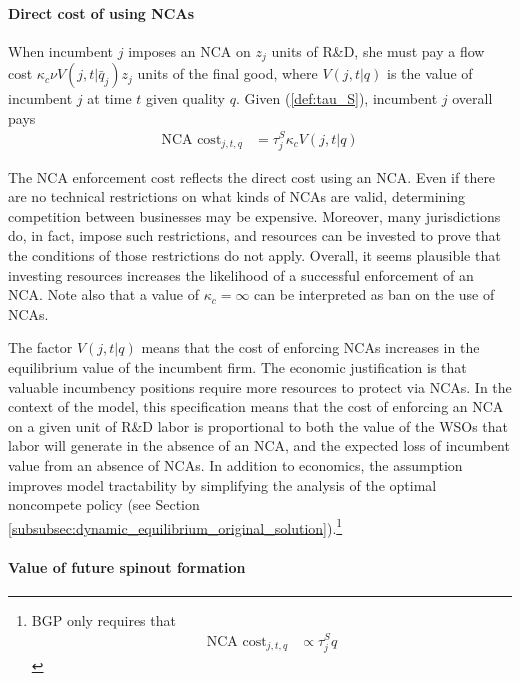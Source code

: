 \documentclass[11pt,english]{article}
\begin{document}
\paragraph{Direct cost of using NCAs}\label{paragraph:nca_cost}

When incumbent $j$ imposes an NCA on $z_j$ units of R\&D, she must pay a flow cost $\kappa_{c} \nu V(j,t|\bar{q}_j) z_j$ units of the final good, where $V(j,t|q)$ is the value of incumbent $j$ at time $t$ given quality $q$. Given (\ref{def:tau_S}), incumbent $j$ overall pays
\begin{align}
	\textrm{NCA cost}_{j,t,q} &= \tau^S_j \kappa_c V(j,t|q) \label{def:nca_cost}
\end{align}

The NCA enforcement cost reflects the direct cost using an NCA. Even if there are no technical restrictions on what kinds of NCAs are valid, determining competition between businesses may be expensive. Moreover, many jurisdictions do, in fact, impose such restrictions, and resources can be invested to prove that the conditions of those restrictions do not apply. Overall, it seems plausible that investing resources increases the likelihood of a successful enforcement of an NCA.  Note also that a value of $\kappa_c = \infty$ can be interpreted as ban on the use of NCAs.

The factor $V(j,t|q)$ means that the cost of enforcing NCAs increases in the equilibrium value of the incumbent firm. The economic justification is that valuable incumbency positions require more resources to protect via NCAs. In the context of the model, this specification means that the cost of enforcing an NCA on a given unit of R\&D labor is proportional to both the value of the WSOs that labor will generate in the absence of an NCA, and the expected loss of incumbent value from an absence of NCAs. In addition to economics, the assumption improves model tractability by simplifying the analysis of the optimal noncompete policy (see Section \ref{subsubsec:dynamic_equilibrium_original_solution}).\footnote{BGP only requires that\begin{align*}
	\textrm{NCA cost}_{j,t,q} &\propto \tau^S_j q
	\end{align*}}

\paragraph{Value of future spinout formation}
\end{document}
